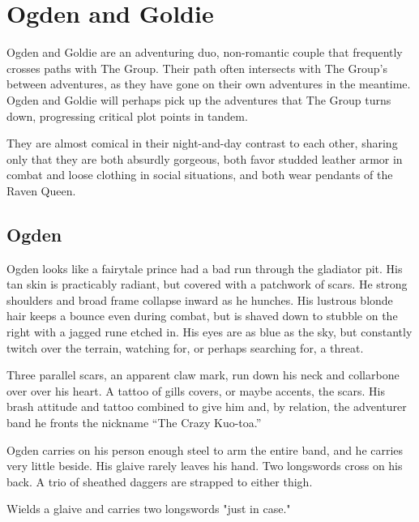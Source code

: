 \section{Ogden and Goldie}\label{sec:ogdenAndGoldie}

Ogden and Goldie are an adventuring duo, non-romantic couple that frequently crosses paths with
The Group.
Their path often intersects with The Group's between adventures, as they have gone on their own
adventures in the meantime.
Ogden and Goldie will perhaps pick up the adventures that The Group turns down, progressing
critical plot points in tandem.

They are almost comical in their night-and-day contrast to each other, sharing only that they are
both absurdly gorgeous, both favor studded leather armor in combat and loose clothing in social
situations, and both wear pendants of the Raven Queen.

\subsection{Ogden}\label{subsec:ogden}

  \begin{aloud}
  Ogden looks like a fairytale prince had a bad run through the gladiator pit.
  His tan skin is practicably radiant, but covered with a patchwork of scars.
  He strong shoulders and broad frame collapse inward as he hunches.
  His lustrous blonde hair keeps a bounce even during combat, but is shaved down to stubble on
    the right with a jagged rune etched in.
  His eyes are as blue as the sky, but constantly twitch over the terrain, watching for, or perhaps
    searching for, a threat.

  Three parallel scars, an apparent claw mark, run down his neck and collarbone over over his heart.
  A tattoo of gills covers, or maybe accents, the scars.
  His brash attitude and tattoo combined to give him and, by relation,
    the adventurer band he fronts the nickname ``The Crazy Kuo-toa.''

  Ogden carries on his person enough steel to arm the entire band,
    and he carries very little beside.
  His glaive rarely leaves his hand.
  Two longswords cross on his back.
  A trio of sheathed daggers are strapped to either thigh.
  \end{aloud}

Wields a glaive and carries two longswords "just in case."

